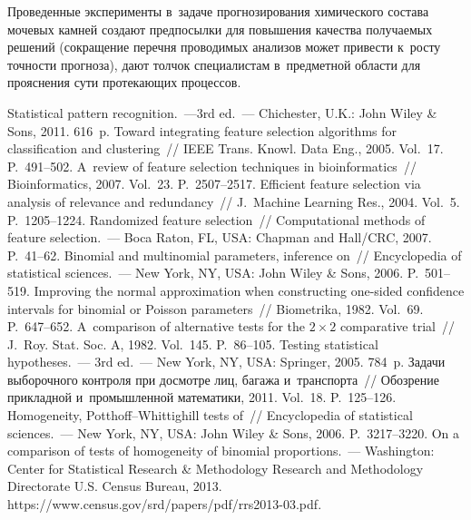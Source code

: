 \begin{multicols}{2}
     Проведенные эксперименты в~задаче прогнозирования химического 
состава мочевых камней создают предпосылки для повышения качества 
получаемых решений (сокращение перечня проводимых анализов может 
привести к~росту точности прогноза), дают толчок специалистам в~предметной 
об\-ласти для прояснения сути протекающих процессов.
{

}

\vspace*{-6pt}
     
{\small\frenchspacing
 {%
 \begin{thebibliography}{99}
 Statistical pattern recognition.~---3rd ed.~--- 
Chichester, U.K.: John Wiley \& Sons, 2011. 616~p.
 Toward integrating feature selection algorithms for classification 
and clustering~// IEEE Trans. Knowl. Data Eng., 2005. Vol.~17. P.~491--502.
 A~review of feature selection techniques in 
bioinformatics~// Bioinformatics, 2007. Vol.~23. P.~2507--2517.
 Efficient feature selection via analysis of relevance and 
redundancy~// J.~Machine Learning Res., 2004. Vol.~5. P.~1205--1224.
 Randomized feature selection~// Computational methods of 
feature selection.~--- Boca Raton, FL, USA: Chapman and Hall/CRC, 2007.  
P.~41--62.
 Binomial and multinomial parameters, inference on~// Encyclopedia of statistical sciences.~--- New York, NY, USA: John Wiley 
\& Sons, 2006. P.~501--519.
 Improving the normal approximation when constructing one-sided 
confidence intervals for binomial or Poisson parameters~// Biometrika, 1982. 
Vol.~69. P.~647--652.
 A~comparison of alternative tests for the $2\times2$ 
comparative trial~// J.~Roy. Stat. Soc. A, 1982. Vol.~145.  
P.~86--105.
 Testing statistical hypotheses.~--- 3rd ed.~--- 
New York, NY, USA: Springer, 2005. 784~p.
 Задачи выборочного контроля при досмотре лиц, багажа 
и~транспорта~// Обозрение прикладной и~промышленной математики, 2011. 
Vol.~18. P.~125--126.
 Homogeneity, Potthoff--Whittighill tests of~// Encyclopedia 
of statistical sciences.~--- New York, NY, USA: John Wiley \& Sons, 2006.  
P.~3217--3220.
 On a comparison of tests of homogeneity of binomial 
proportions.~--- Washington: Center for Statistical Research \& Methodology 
Research and Methodology Directorate U.S. Census Bureau, 2013. {\sf 
https://www.census.gov/srd/papers/pdf/rrs2013-03.pdf}.
\end{thebibliography}

 }
 }

\end{multicols}

